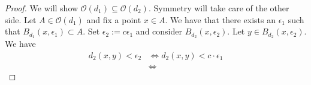 \documentclass[a4paper]{article}
\begin{document}
    \begin{proof}
        We will show \(\mathcal{O}(d_1) \subseteq \mathcal{O}(d_2)\). Symmetry will take care of the other side. Let \(A \in \mathcal{O}(d_1)\) and fix a point \(x \in A\). We have that there exists an \(\epsilon_1\) such that \(B_{d_1}(x, \epsilon_1) \subset A\). Set \(\epsilon_2 := c \epsilon_1\) and consider \(B_{d_2}(x, \epsilon_2)\). Let \(y \in B_{d_2}(x, \epsilon_2)\). We have
        \begin{align}
            d_2(x, y) < \epsilon_2 & \iff d_2(x, y) < c \cdot \epsilon_1 \\
            & \iff
        \end{align}
    \end{proof}
\end{document}
